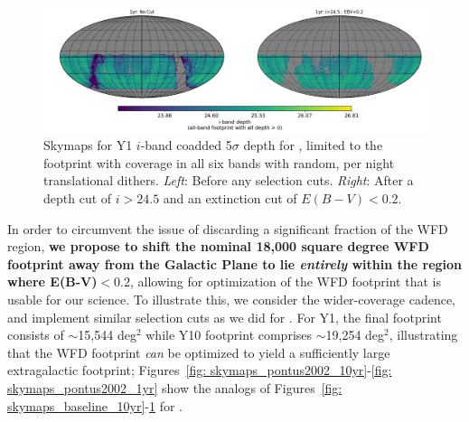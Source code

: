 \begin{figure}[H]
	\vspace*{2em}
	\centering\includegraphics[width=\linewidth,trim={30 40 40 40},clip=false]{figures/lss_final_footprint_skymap_baseline2018a_nside256_RandomDitherPerNight_1yr_iband.png}
	\vspace*{1em}
	\caption{Skymaps for Y1 $i$-band coadded 5$\sigma$ depth for , limited to the footprint with coverage in all six bands with random, per night translational dithers. \textit{Left}: Before any selection cuts.  \textit{Right}: After a depth cut of $i>24.5$ and an extinction cut of $E(B-V)<0.2$.}
	\label{fig: skymaps_baseline_1yr}
\end{figure}

In order to circumvent the issue of discarding a significant fraction of the WFD region, {\bf we propose to shift the nominal 18,000 square degree WFD footprint away from the Galactic Plane to lie {\em entirely} within the region where E(B-V)$<0.2$}, allowing for optimization of the WFD footprint that is usable for our science. To illustrate this, we consider the wider-coverage  cadence,  and implement similar selection cuts as we did for . For Y1, the final footprint consists of $\sim$15,544 deg$^2$ while Y10 footprint comprises $\sim$19,254 deg$^2$, illustrating that the WFD footprint {\em can} be optimized to yield a sufficiently large extragalactic footprint; Figures~\ref{fig: skymaps_pontus2002_10yr}-\ref{fig: skymaps_pontus2002_1yr}  show the analogs of Figures~\ref{fig: skymaps_baseline_10yr}-\ref{fig: skymaps_baseline_1yr} for .

